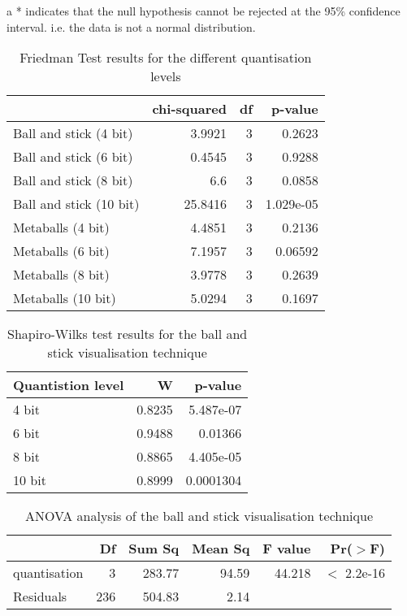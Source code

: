 a * indicates that the null hypothesis cannot be rejected at the 95\%
confidence interval. i.e. the data is not a normal distribution.


\begin{table}[h!]
  \begin{tabular}{ | l | r | r | r | }
  \hline
                          & chi-squared & df &    p-value  \\ \hline
  Ball and stick (4 bit)  &      3.9921 &  3 &     0.2623  \\ \hline
  Ball and stick (6 bit)  &      0.4545 &  3 &     0.9288  \\ \hline
  Ball and stick (8 bit)  &         6.6 &  3 &     0.0858  \\ \hline
  Ball and stick (10 bit) &     25.8416 &  3 &  1.029e-05  \\ \hline
  Metaballs (4 bit)       &      4.4851 &  3 &     0.2136  \\ \hline
  Metaballs (6 bit)       &      7.1957 &  3 &    0.06592  \\ \hline
  Metaballs (8 bit)       &      3.9778 &  3 &     0.2639  \\ \hline
  Metaballs (10 bit)      &      5.0294 &  3 &     0.1697  \\ \hline
  \end{tabular}
  \caption{Friedman Test results for the different quantisation levels}
  \label{tab:friedman_test_results}
\end{table}


\begin{table}[h!]
  \begin{tabular}{ | l | r | r | }
  \hline
  Quantistion level &      W &   p-value  \\ \hline
  4 bit             & 0.8235 & 5.487e-07  \\ \hline
  6 bit             & 0.9488 &   0.01366  \\ \hline
  8 bit             & 0.8865 & 4.405e-05  \\ \hline
  10 bit            & 0.8999 & 0.0001304  \\ \hline
  \end{tabular}
  \caption{Shapiro-Wilks test results for the ball and stick visualisation
  technique}
  \label{tab:ballstick_normality}
\end{table}


\begin{table}[h!]
  \begin{tabular}{ | l | r | r | r | r | r | }
  \hline
               &  Df & Sum Sq & Mean Sq & F value &   Pr($>$F)   \\ \hline
  quantisation &   3 & 283.77 &   94.59 &  44.218 & $<$ 2.2e-16  \\ \hline
  Residuals    & 236 & 504.83 &    2.14 &         &              \\ \hline
  \end{tabular}
  \caption{ANOVA analysis of the ball and stick visualisation technique}
  \label{tab:ballstick_anova}
\end{table}


